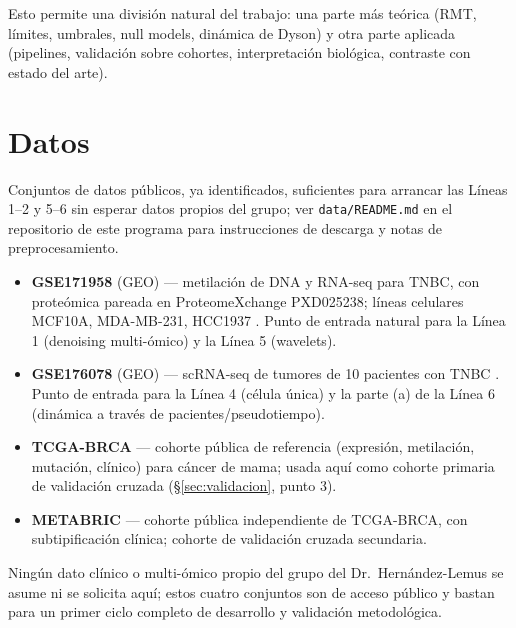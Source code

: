 \documentclass[11pt]{article}
\begin{document}
Esto permite una división natural del trabajo: una parte más teórica (RMT, límites, umbrales, null models, dinámica de Dyson) y otra parte aplicada (pipelines, validación sobre cohortes, interpretación biológica, contraste con estado del arte).

\section{Datos}
\label{sec:datos}
Conjuntos de datos públicos, ya identificados, suficientes para arrancar las Líneas 1--2 y 5--6 sin esperar datos propios del grupo; ver \texttt{data/README.md} en el repositorio de este programa para instrucciones de descarga y notas de preprocesamiento.
\begin{itemize}
    \item \textbf{GSE171958} (GEO) --- metilación de DNA y RNA-seq para TNBC, con proteómica pareada en ProteomeXchange PXD025238; líneas celulares MCF10A, MDA-MB-231, HCC1937 \cite{tnbcmultiomics2021}. Punto de entrada natural para la Línea 1 (denoising multi-ómico) y la Línea 5 (wavelets).
    \item \textbf{GSE176078} (GEO) --- scRNA-seq de tumores de 10 pacientes con TNBC \cite{tnbcsc2021}. Punto de entrada para la Línea 4 (célula única) y la parte (a) de la Línea 6 (dinámica a través de pacientes/pseudotiempo).
    \item \textbf{TCGA-BRCA} --- cohorte pública de referencia (expresión, metilación, mutación, clínico) para cáncer de mama; usada aquí como cohorte primaria de validación cruzada (\S\ref{sec:validacion}, punto 3).
    \item \textbf{METABRIC} --- cohorte pública independiente de TCGA-BRCA, con subtipificación clínica; cohorte de validación cruzada secundaria.
\end{itemize}
Ningún dato clínico o multi-ómico propio del grupo del Dr.\ Hernández-Lemus se asume ni se solicita aquí; estos cuatro conjuntos son de acceso público y bastan para un primer ciclo completo de desarrollo y validación metodológica.
\end{document}
